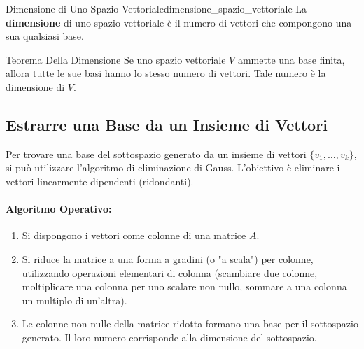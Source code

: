 \documentclass{article}
\begin{document}
\begin{definition}{Dimensione di Uno Spazio Vettoriale}{dimensione_spazio_vettoriale}
    La \textbf{dimensione} di uno spazio vettoriale è il numero di vettori che compongono una sua qualsiasi \hyperref[def:base]{base}.
\end{definition}

\begin{theorem}{Teorema Della Dimensione}{}
    Se uno spazio vettoriale $V$ ammette una base finita, allora tutte le sue basi hanno lo stesso numero di vettori. Tale numero è la dimensione di $V$.
\end{theorem}

\subsection{Estrarre una Base da un Insieme di Vettori}

Per trovare una base del sottospazio generato da un insieme di vettori $\{v_1, \dots, v_k\}$, si può utilizzare l'algoritmo di eliminazione di Gauss. L'obiettivo è eliminare i vettori linearmente dipendenti (ridondanti).

\paragraph{Algoritmo Operativo:}
\begin{enumerate}
    \item Si dispongono i vettori come colonne di una matrice $A$.
    \item Si riduce la matrice a una forma a gradini (o "a scala") per colonne, utilizzando operazioni elementari di colonna (scambiare due colonne, moltiplicare una colonna per uno scalare non nullo, sommare a una colonna un multiplo di un'altra).
    \item Le colonne non nulle della matrice ridotta formano una base per il sottospazio generato. Il loro numero corrisponde alla dimensione del sottospazio.
\end{enumerate}
\end{document}
